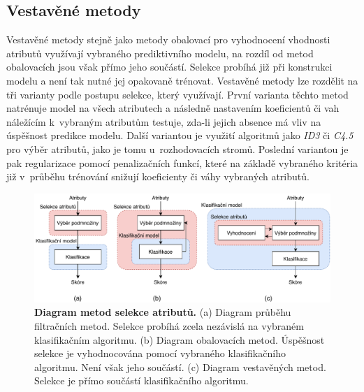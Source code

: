 \subsection*{Vestavěné metody}
\label{vestavene_metody}
Vestavěné metody stejně jako metody obalovací pro vyhodnocení vhodnosti atributů využívají vybraného prediktivního modelu, na rozdíl od metod obalovacích jsou však přímo jeho součástí. Selekce probíhá již při konstrukci modelu a není tak nutné jej opakovaně trénovat. Vestavěné metody lze rozdělit na tři varianty podle postupu selekce, který využívají. První varianta těchto metod natrénuje model na všech atributech a následně nastavením koeficientů či vah náležícím k~vybraným atributům testuje, zda-li jejich absence má vliv na úspěšnost predikce modelu. Další variantou je využití algoritmů jako \textit{ID3} či \textit{C4.5} pro výběr atributů, jako je tomu u~rozhodovacích stromů. Poslední variantou je pak regularizace pomocí penalizačních funkcí, které na základě vybraného kritéria již v~průběhu trénování snižují koeficienty či váhy vybraných atributů.\cite{data_classification}

\begin{figure}[h]
    \includegraphics[width=\textwidth]{obrazky/selekce_atributu.pdf}
    \caption{\textbf{Diagram metod selekce atributů.} (a) Diagram průběhu filtračních metod. Selekce probíhá zcela nezávislá na vybraném klasifikačním algoritmu. (b) Diagram obalovacích metod. Úspěšnost selekce je vyhodnocována pomocí vybraného klasifikačního algoritmu. Není však jeho součástí. (c) Diagram vestavěných metod. Selekce je přímo součástí klasifikačního algoritmu.}
    \label{obr_selekce_atributu}
\end{figure}

